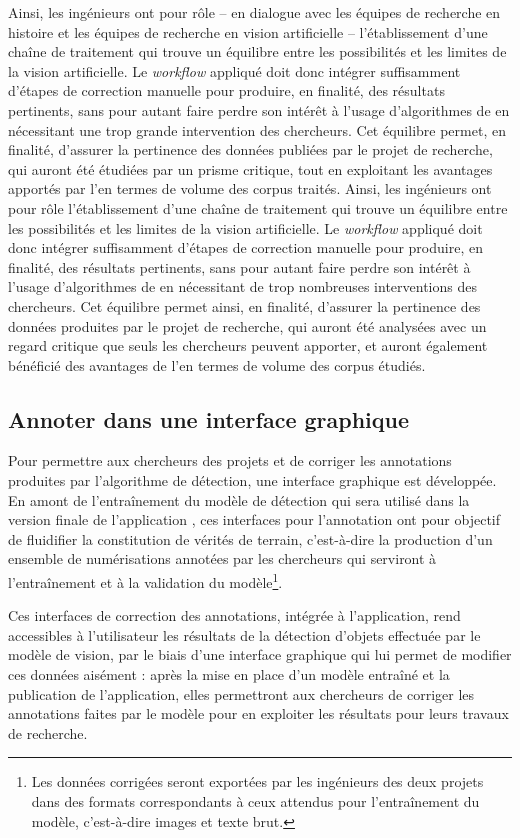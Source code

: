 	Ainsi, les ingénieurs ont pour rôle -- en dialogue avec les équipes de recherche en histoire et les équipes de recherche en vision artificielle -- l'établissement d'une chaîne de traitement qui trouve un équilibre entre les possibilités et les limites de la vision artificielle. Le \textit{workflow} appliqué doit donc intégrer suffisamment d'étapes de correction manuelle pour produire, en finalité, des résultats pertinents, sans pour autant faire perdre son intérêt à l'usage d'algorithmes de \cv en nécessitant une trop grande intervention des chercheurs. Cet équilibre permet, en finalité, d'assurer la pertinence des données publiées par le projet de recherche, qui auront été étudiées par un prisme critique, tout en exploitant les avantages apportés par l'\ia en termes de volume des corpus traités.
	Ainsi, les ingénieurs ont pour rôle l'établissement d'une chaîne de traitement qui trouve un équilibre entre les possibilités et les limites de la vision artificielle. Le \textit{workflow} appliqué doit donc intégrer suffisamment d'étapes de correction manuelle pour produire, en finalité, des résultats pertinents, sans pour autant faire perdre son intérêt à l'usage d'algorithmes de \cv en nécessitant de trop nombreuses interventions des chercheurs. Cet équilibre permet ainsi, en finalité, d'assurer la pertinence des données produites par le projet de recherche, qui auront été analysées avec un regard critique que seuls les chercheurs peuvent apporter, et auront également bénéficié des avantages de l'\ia en termes de volume des corpus étudiés. 
	
\subsection{Annoter dans une interface graphique}
    Pour permettre aux chercheurs des projets \eida et \vhs de corriger les annotations produites par l'algorithme de détection, une interface graphique est développée. En amont de l'entraînement du modèle de détection qui sera utilisé dans la version finale de l'application \eida, ces interfaces pour l'annotation ont pour objectif de fluidifier la constitution de vérités de terrain, c'est-à-dire la production d'un ensemble de numérisations annotées par les chercheurs qui serviront à l'entraînement et à la validation du modèle\footnote{Les données corrigées seront exportées par les ingénieurs des deux projets dans des formats correspondants à ceux attendus pour l'entraînement du modèle, c'est-à-dire images et texte brut.}.
     
    Ces interfaces de correction des annotations, intégrée à l'application, rend accessibles à l'utilisateur les résultats de la détection d'objets effectuée par le modèle de vision, par le biais d'une interface graphique qui lui permet de modifier ces données aisément : après la mise en place d'un modèle entraîné et la publication de l'application, elles permettront aux chercheurs de corriger les annotations faites par le modèle pour en exploiter les résultats pour leurs travaux de recherche.
    
